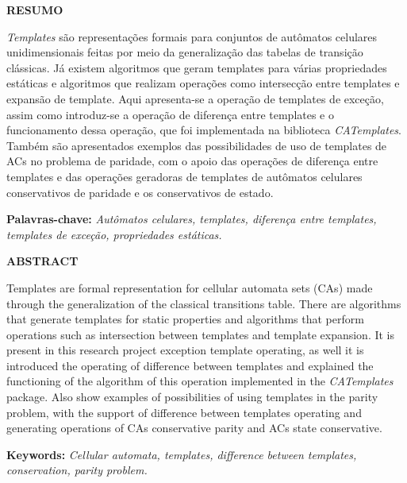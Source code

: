 \newpage
\thispagestyle{plain}
\begin{center}
\large
\textbf{RESUMO}
\end{center}
\textit{Templates} são representações formais para conjuntos de autômatos celulares unidimensionais feitas por meio da generalização das tabelas de transição clássicas. Já existem algoritmos que geram templates para várias propriedades estáticas e algoritmos que realizam operações como intersecção entre templates e expansão de template. Aqui apresenta-se a operação de templates de exceção, assim como introduz-se a operação de diferença entre templates e o funcionamento dessa operação, que foi implementada na biblioteca \textit{CATemplates}. Também são apresentados exemplos das possibilidades de uso de templates de ACs no problema de paridade, com o apoio das operações de diferença entre templates e das operações geradoras de templates de autômatos celulares conservativos de paridade e os conservativos de estado.
\\[0.5cm]
\begin{flushleft}
{\bf Palavras-chave:} {\it Autômatos celulares, templates, diferença entre templates, templates de exceção, propriedades estáticas.}
\end{flushleft}

\newpage
\thispagestyle{plain}
\begin{center}
\large  
\textbf{ABSTRACT}
\end{center}
Templates are formal representation for cellular automata sets (CAs) made through the generalization of the classical transitions table. There are algorithms that generate templates for static properties and algorithms that perform operations such as intersection between templates and template expansion. It is present in this research project exception template operating, as well it is introduced the operating of difference between templates and explained the functioning of the algorithm of this operation implemented in the \textit{CATemplates} package. Also show examples of possibilities of using templates in the parity problem, with the support of difference between templates operating and generating operations of CAs conservative parity and ACs state conservative.
\\[0.5cm]
\begin{flushleft}
{\bf Keywords:} {\it Cellular automata, templates, difference between templates, conservation, parity problem.}
\end{flushleft}